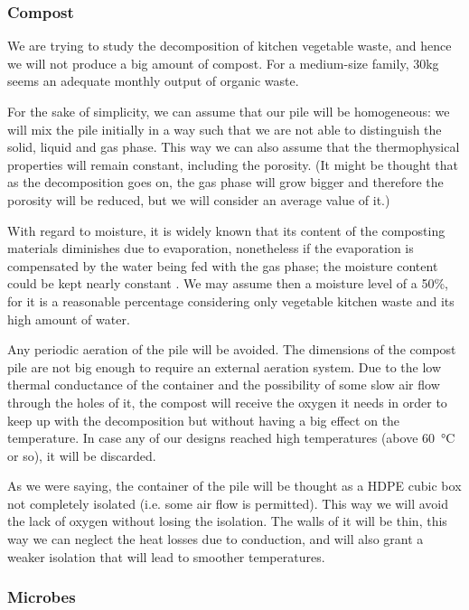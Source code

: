 \documentclass[12pt, a4paper, twocolumn]{article}
\numberwithin{table}{section}
\numberwithin{figure}{section}
\numberwithin{equation}{section}
\begin{document}
\subsubsection{Compost}

We are trying to study the decomposition of kitchen vegetable waste, and hence we will not produce a big amount of compost. For a medium-size family, \si{30}{kg} seems an adequate monthly output of organic waste. 

For the sake of simplicity, we can assume that our pile will be homogeneous: we will mix the pile initially in a way such that we are not able to distinguish the solid, liquid and gas phase. This way we can also assume that the thermophysical properties will remain constant, including the porosity. (It might be thought that as the decomposition goes on, the gas phase will grow bigger and therefore the porosity will be reduced, but we will consider an average value of it.) %

With regard to moisture, it is widely known that its content of the composting materials diminishes due to evaporation, nonetheless if the evaporation is compensated by the water being fed with the gas phase; the moisture content could be kept nearly constant \cite{niceassumptions}. We may assume then a moisture level of a 50\%, for it is a reasonable percentage considering only vegetable kitchen waste and its high amount of water. 

Any periodic aeration of the pile will be avoided. The dimensions of the compost pile are not big enough to require an external aeration system. Due to the low thermal conductance of the container and the possibility of some slow air flow through the holes of it, the compost will receive the oxygen it needs in order to keep up with the decomposition but without having a big effect on the temperature. In case any of our designs reached high temperatures (above \SI{60}{\celsius} or so), it will be discarded. 

As we were saying, the container of the pile will be thought as a HDPE cubic box not completely isolated (i.e. some air flow is permitted). This way we will avoid the lack of oxygen without losing the isolation. The walls of it will be thin, this way we can neglect the heat losses due to conduction, and will also grant a weaker isolation that will lead to smoother temperatures. 

\subsubsection{Microbes}
\end{document}
